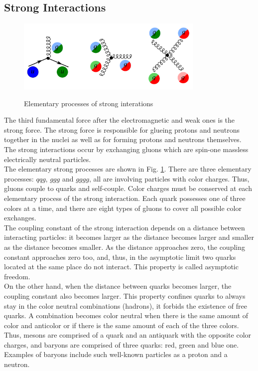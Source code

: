 \subsection{Strong Interactions}
\label{sec:Intro_QCD}

\begin{figure}[htb]
  \begin{center}
    {\includegraphics[width=0.80\textwidth]{../figs/Intro/feynmStrong.png}}
    \caption{Elementary processes of strong interations}
    \label{fig:feynmStrong}
  \end{center}
\end{figure}


The third fundamental force after the electromagnetic and weak ones is the strong force. The strong force is responsible for glueing protons and neutrons together in the nuclei as well as for forming protons and neutrons themselves. The strong interactions occur by exchanging gluons which are spin-one massless electrically neutral particles.  \\

The elementary strong processes are shown in Fig. \ref{fig:feynmStrong}. There are three elementary processes: $qqg$, $ggg$ and $gggg$, all are involving particles with color charges. Thus, gluons couple to quarks and self-couple. Color charges must be conserved at each elementary process of the strong interaction. Each quark possesses one of three colors at a time, and there are eight types of gluons to cover all possible color exchanges. \\

The coupling constant of the strong interaction depends on a distance between interacting particles: it becomes larger as the distance becomes larger and smaller as the distance becomes smaller. As the distance approaches zero, the coupling constant approaches zero too, and, thus, in the asymptotic limit two quarks located at the same place do not interact. This property is called asymptotic freedom.\\

On the other hand, when the distance between quarks becomes larger, the coupling constant also becomes larger. This property confines quarks to always stay in the color neutral combinations (hadrons), it forbids the existence of free quarks. A combination becomes color neutral when there is the same amount of color and anticolor or if there is the same amount of each of the three colors.  Thus, mesons are comprised of a quark and an antiquark with the opposite color charges, and baryons are comprised of three quarks: red, green and blue one. Examples of baryons include such well-known particles as a proton and a neutron.\\

